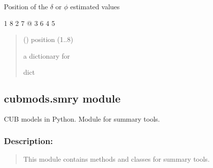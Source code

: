 \documentclass[letterpaper,10pt,english]{sphinxmanual}
\begin{document}
\begin{fulllineitems}
\label{\detokenize{cubmods:cubmods.multicub.pos_kwargs}}
\pysigstartsignatures
{}
\pysigstopsignatures
\sphinxAtStartPar
Position of the \(\delta\) or \(\phi\) estimated values

\begin{sphinxVerbatim}[commandchars=\\\{\}]
    1
  8   2
7   @   3
  6   4
    5
\end{sphinxVerbatim}
\begin{quote}\begin{description}
\sphinxAtStartPar
{} () \textendash{} position (1..8)

\sphinxAtStartPar
a dictionary for 

\sphinxAtStartPar
dict

\end{description}\end{quote}

\end{fulllineitems}



\subsection{cubmods.smry module}
\label{\detokenize{cubmods:module-cubmods.smry}}\label{\detokenize{cubmods:cubmods-smry-module}}
\sphinxAtStartPar
CUB models in Python.
Module for summary tools.


\subsubsection{Description:}
\label{\detokenize{cubmods:id92}}\begin{quote}

\sphinxAtStartPar
This module contains methods and classes
for summary tools.
\end{quote}
\end{document}
